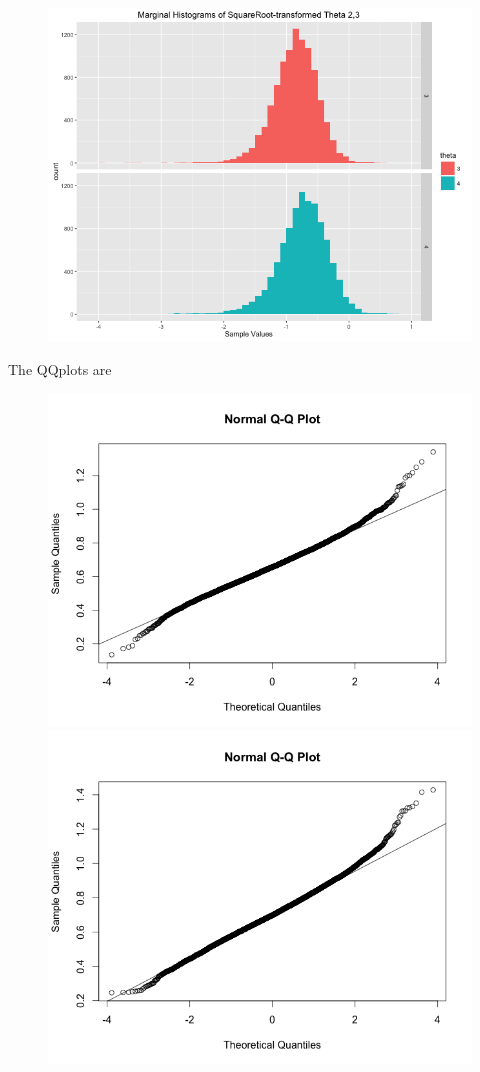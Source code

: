 \documentclass[11pt]{article}
\begin{document}
\begin{enumerate}
\begin{enumerate}
\begin{figure}[H]
			\includegraphics[scale=0.5]{Rplot06}
			\end{figure}
			The QQplots are
			\begin{figure}[H]
				\includegraphics[scale=0.4]{Rplot07}
				\includegraphics[scale=0.4]{Rplot08}

\end{figure}
\end{enumerate}
\end{enumerate}
\end{document}
